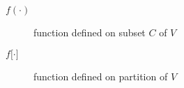 \begin{description}
\item[$f(\cdot)$] function defined on subset $C$ of $V$
\item[$f{[}\cdot{]}$] function defined on partition of $V$
\end{description}
